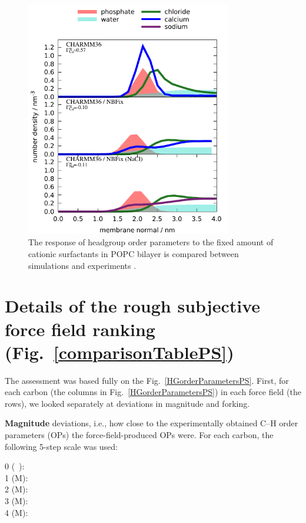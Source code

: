 \documentclass[journal=jpcbfk]{achemso}
\begin{document}
\begin{figure}[]
  \centering
  \includegraphics[width=9.0cm]{../Figs/density_profile_CHARMM_CaCl_POPC_NBFix.pdf}
  \caption{\label{density_profile_CHARMM_CaCl_POPC_NBFix}
  The response of headgroup order parameters to the fixed amount of cationic surfactants in
  POPC bilayer is compared between simulations and experiments \cite{scherer89}.}
\end{figure}

\pagebreak
\section{Details of the rough subjective force field ranking (Fig.~\ref{comparisonTablePS})} 

The assessment was based fully on the Fig.~\ref{HGorderParametersPS}.
%
First, for each carbon (the columns in Fig.~\ref{HGorderParametersPS}) in each force field (the rows),
we looked separately at deviations in magnitude and forking.

{\bf Magnitude} deviations, i.e., how close to the experimentally obtained C--H order parameters (OPs)
the force-field-produced OPs were.
%
For each carbon, the following 5-step scale was used:
%
\begin{description}
\item [0 (~):] 
%
\item [1 ({\textsf{\tiny M}}):] 
%
\item [2  ({\textsf{\small M}}):] 
%
\item [3 ({\textsf{\large M}}):] 
%
\item [4 ({\textsf{\Large M}}):] 
\end{description}
\end{document}
